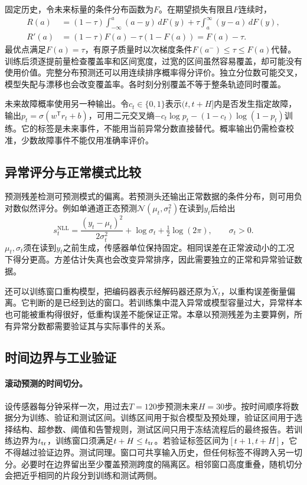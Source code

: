 固定历史，令未来标量的条件分布函数为$F$。在期望损失有限且$F$连续时，
\begin{align}
 R(a)&=(1-\tau)\int_{-\infty}^a(a-y)\,dF(y)+\tau\int_a^\infty(y-a)\,dF(y),\\
 R'(a)&=(1-\tau)F(a)-\tau(1-F(a))=F(a)-\tau.
\end{align}
最优点满足$F(a)=\tau$，有原子质量时以次梯度条件$F(a^-)\leq\tau\leq F(a)$代替。训练后须逐提前量检查覆盖率和区间宽度，过宽的区间虽然容易覆盖，却可能没有使用价值。完整分布预测还可以用连续排序概率得分评价。独立分位数可能交叉，模型失配与漂移也会改变覆盖率。各时刻分别覆盖不等于整条轨迹同时覆盖。

未来故障概率使用另一种输出。令$c_t\in\{0,1\}$表示$(t,t+H]$内是否发生指定故障，输出$p_t=\sigma(w^{\mathsf T}r_t+b)$，可用二元交叉熵$-c_t\log p_t-(1-c_t)\log(1-p_t)$训练。它的标签是未来事件，不能用当前异常分数直接替代。概率输出仍需检查校准，少数故障事件不能仅用准确率评价。

\subsection{异常评分与正常模式比较}
\label{sec:sequence-anomaly-score}
预测残差检测可预测模式的偏离。若预测头还输出正常数据的条件分布，则可用负对数似然评分。例如单通道正态预测$\mathcal N(\mu_t,\sigma_t^2)$在读到$y_t$后给出
\begin{equation}
 s_t^{\mathrm{NLL}}=\frac{(y_t-\mu_t)^2}{2\sigma_t^2}+\log\sigma_t+\tfrac12\log(2\pi),\qquad\sigma_t>0.
\end{equation}
$\mu_t,\sigma_t$须在读到$y_t$之前生成，传感器单位保持固定。相同误差在正常波动小的工况下得分更高。方差估计失真也会改变异常排序，因此需要独立的正常和异常验证数据。

还可以训练窗口重构模型，把编码器表示经解码器还原为$\tilde X_t$，以重构误差衡量偏离。它判断的是已经到达的窗口。若训练集中混入异常或模型容量过大，异常样本也可能被重构得很好，低重构误差不能保证正常。本章以预测残差为主要算例，所有异常分数都需要验证其与实际事件的关系。

\subsection{时间边界与工业验证}
\label{sec:sequence-validation}
\paragraph{滚动预测的时间切分。}
设传感器每分钟采样一次，用过去$T=120$步预测未来$H=30$步。按时间顺序将数据分为训练、验证和测试区间。训练区间用于拟合模型及预处理，验证区间用于选择结构、超参数、阈值和告警规则，测试区间只用于冻结流程后的最终报告。若训练边界为$t_{\rm tr}$，训练窗口须满足$t+H\leq t_{\rm tr}$。若验证标签区间为$[t+1,t+H]$，它不得越过验证边界。测试同理。窗口可共享输入历史，但任何标签不得跨入另一切分。必要时在边界留出至少覆盖预测跨度的隔离区。相邻窗口高度重叠，随机切分会把近乎相同的片段分到训练和测试两侧。

